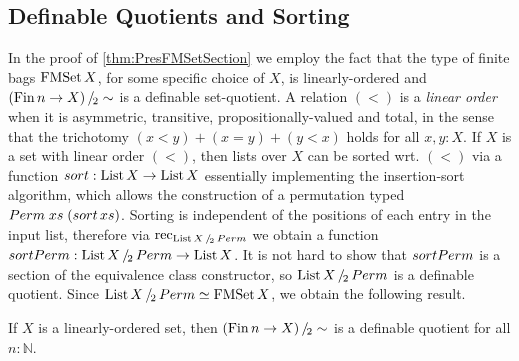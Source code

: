 \documentclass[final,a4paper,USenglish,cleveref]{lipics-v2021}
\begin{document}
\subsection{Definable Quotients and Sorting}\label{sec:Sorting}

In the proof of \cref{thm:PresFMSetSection} we employ the fact that the type of finite bags $\FMSet X$, for some specific choice of $X$, is linearly-ordered and $\SetQuot[(\Fin n \to X)][\sim]$ is a definable set-quotient.
A relation $(<)$ is a \emph{linear order} when it is asymmetric, transitive, propositionally-valued and total, in the sense that the trichotomy $(x < y) + (x = y) + (y < x)$ holds for all $x,y:X$.
If $X$ is a set with linear order $(<)$, then lists over $X$ can be sorted wrt. $(<)$ via a function $\sort : \List X \to \List X$ essentially implementing the insertion-sort algorithm, which allows the construction of a permutation typed $\Perm \;xs\;(\sort\,xs)$. Sorting is independent of the positions of each entry in the input list, therefore via $\Rec{\SetQuot[\List X][\Perm]}$ we obtain a function $\sortPerm : \SetQuot[\List X][\Perm] \to \List X$. It is not hard to show that $\sortPerm$ is a section of the equivalence class constructor, so $\SetQuot[\List X][\Perm]$ is a definable quotient.
Since $\SetQuot[\List X][\Perm] \simeq \FMSet X$, we obtain the following result.
\begin{proposition}\label{prop:ListPermDefQuot}
If $X$ is a linearly-ordered set, then $\SetQuot[(\Fin n \to X)][\sim]$ is a definable quotient for all $n : ℕ$.
\end{proposition}
\end{document}
